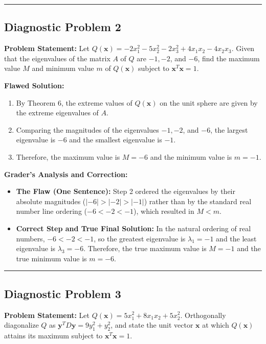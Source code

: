\documentclass[11pt, letterpaper]{article}
\theoremstyle{definition}
\theoremstyle{remark}
\begin{document}
\medskip
\hrule
\medskip

\subsection*{Diagnostic Problem 2}
\textbf{Problem Statement:} Let $Q(\mathbf{x}) = -2x_1^2 - 5x_2^2 - 2x_3^2 + 4x_1x_2 - 4x_2x_3$. Given that the eigenvalues of the matrix $A$ of $Q$ are $-1, -2$, and $-6$, find the maximum value $M$ and minimum value $m$ of $Q(\mathbf{x})$ subject to $\mathbf{x}^T\mathbf{x} = 1$.

\textbf{Flawed Solution:}
\begin{enumerate}[label=\arabic*.]
    \item By Theorem 6, the extreme values of $Q(\mathbf{x})$ on the unit sphere are given by the extreme eigenvalues of $A$.
    \item Comparing the magnitudes of the eigenvalues $-1, -2$, and $-6$, the largest eigenvalue is $-6$ and the smallest eigenvalue is $-1$.
    \item Therefore, the maximum value is $M = -6$ and the minimum value is $m = -1$.
\end{enumerate}

\textbf{Grader's Analysis and Correction:}
\begin{itemize}
    \item \textbf{The Flaw (One Sentence):} Step 2 ordered the eigenvalues by their absolute magnitudes ($|-6| > |-2| > |-1|$) rather than by the standard real number line ordering ($-6 < -2 < -1$), which resulted in $M < m$.
    \item \textbf{Correct Step and True Final Solution:} In the natural ordering of real numbers, $-6 < -2 < -1$, so the greatest eigenvalue is $\lambda_1 = -1$ and the least eigenvalue is $\lambda_3 = -6$. Therefore, the true maximum value is $M = -1$ and the true minimum value is $m = -6$.
\end{itemize}

\medskip
\hrule
\medskip

\subsection*{Diagnostic Problem 3}
\textbf{Problem Statement:} Let $Q(\mathbf{x}) = 5x_1^2 + 8x_1x_2 + 5x_2^2$. Orthogonally diagonalize $Q$ as $\mathbf{y}^T D \mathbf{y} = 9y_1^2 + y_2^2$, and state the unit vector $\mathbf{x}$ at which $Q(\mathbf{x})$ attains its maximum subject to $\mathbf{x}^T\mathbf{x} = 1$.
\end{document}
